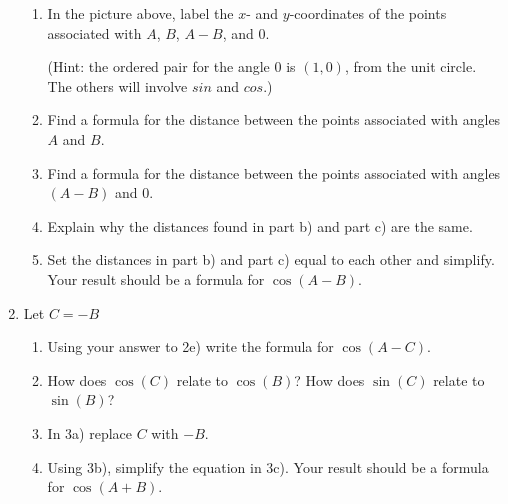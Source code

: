 \documentclass[number]{ximera}
\begin{document}
\begin{enumerate}
\begin{enumerate}

\item In the picture above, label the $x$- and $y$-coordinates of the points associated with $A$, $B$, $A-B$, and $0$.

(Hint: the ordered pair for the angle $0$ is $(1,0)$, from the unit circle. The others will involve $sin$ and $cos$.)

\item Find a formula for the distance between the points associated with angles $A$ and $B$.

\item Find a formula for the distance between the points associated with angles $(A-B)$ and $0$.

\item Explain why the distances found in part b) and part c) are the same.

\item Set the distances in part b) and part c) equal to each other and simplify. Your result should be a formula for $\cos(A-B)$.

\end{enumerate}

\item Let $C = -B$

\begin{enumerate}

\item Using your answer to 2e) write the formula for $\cos(A-C)$.

\item How does $\cos (C)$ relate to $\cos (B)$? How does $\sin (C)$ relate to $\sin (B)$? 

\item In 3a) replace $C$ with $-B$.

\item Using 3b), simplify the equation in 3c). Your result should be a formula for $\cos(A+B)$.

\end{enumerate}

\end{enumerate}
\end{document}
